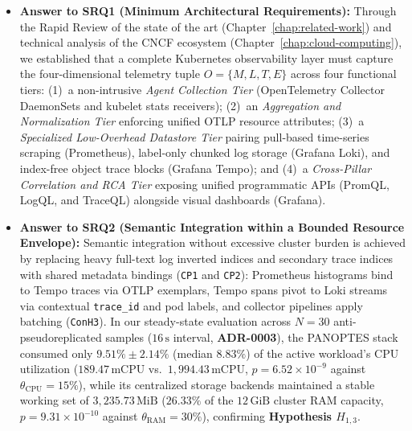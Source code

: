 \begin{itemize}
    \item \textbf{Answer to SRQ1 (Minimum Architectural Requirements):} Through the Rapid Review of the state of the art (Chapter~\ref{chap:related-work}) and technical analysis of the CNCF ecosystem (Chapter~\ref{chap:cloud-computing}), we established that a complete Kubernetes observability layer must capture the four-dimensional telemetry tuple $O = \{M, L, T, E\}$ across four functional tiers: (1)~a non-intrusive \textit{Agent Collection Tier} (OpenTelemetry Collector DaemonSets and kubelet stats receivers); (2)~an \textit{Aggregation and Normalization Tier} enforcing unified OTLP resource attributes; (3)~a \textit{Specialized Low-Overhead Datastore Tier} pairing pull-based time-series scraping (Prometheus), label-only chunked log storage (Grafana Loki), and index-free object trace blocks (Grafana Tempo); and (4)~a \textit{Cross-Pillar Correlation and RCA Tier} exposing unified programmatic APIs (PromQL, LogQL, and TraceQL) alongside visual dashboards (Grafana).

    \item \textbf{Answer to SRQ2 (Semantic Integration within a Bounded Resource Envelope):} Semantic integration without excessive cluster burden is achieved by replacing heavy full-text log inverted indices and secondary trace indices with shared metadata bindings (\texttt{CP1} and \texttt{CP2}): Prometheus histograms bind to Tempo traces via OTLP exemplars, Tempo spans pivot to Loki streams via contextual \texttt{trace\_id} and pod labels, and collector pipelines apply batching (\texttt{ConH3}). In our steady-state evaluation across $N=30$ anti-pseudoreplicated samples ($16\,\text{s}$ interval, \textbf{ADR-0003}), the PANOPTES stack consumed only $\mathbf{9.51\% \pm 2.14\%}$ (median $\mathbf{8.83\%}$) of the active workload's CPU utilization ($189.47\,\text{mCPU}$ vs.\ $1{,}994.43\,\text{mCPU}$, $p = 6.52 \times 10^{-9}$ against $\theta_{\text{CPU}} = 15\%$), while its centralized storage backends maintained a stable working set of $3{,}235.73\,\text{MiB}$ ($\mathbf{26.33\%}$ of the $12\,\text{GiB}$ cluster RAM capacity, $p = 9.31 \times 10^{-10}$ against $\theta_{\text{RAM}} = 30\%$), confirming \textbf{Hypothesis $H_{1,3}$}.


\end{itemize}
